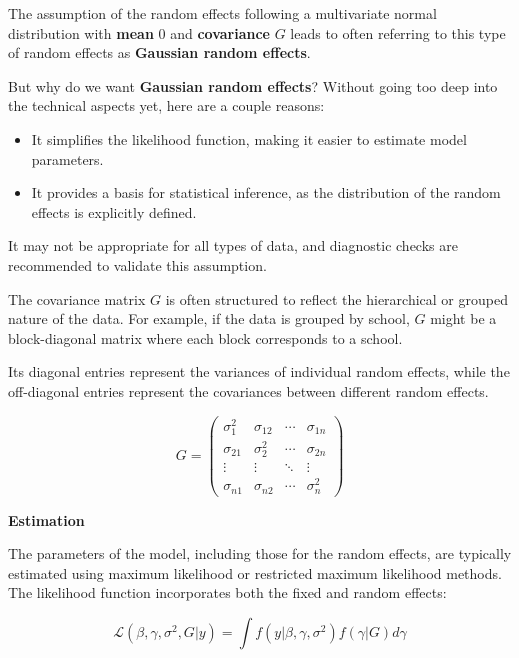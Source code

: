 \documentclass[12pt, twoside,hidelinks]{article}
\theoremstyle{definition}
\numberwithin{equation}{section}
\begin{document}
The assumption of the random effects following a multivariate normal distribution with \textbf{mean} $0$ and \textbf{covariance} $G$ leads to often referring to this type of random effects as \textbf{Gaussian random effects}.
\newline

But why do we want \textbf{Gaussian random effects}? Without going too deep into the technical aspects yet, here are a couple reasons:

\begin{itemize}
    \item It simplifies the likelihood function, making it easier to estimate model parameters.
    \item It provides a basis for statistical inference, as the distribution of the random effects is explicitly defined.
\end{itemize}

It may not be appropriate for all types of data, and diagnostic checks are recommended to validate this assumption.
\newline


The covariance matrix \( G \) is often structured to reflect the hierarchical or grouped nature of the data. For example, if the data is grouped by school, \( G \) might be a block-diagonal matrix where each block corresponds to a school.
\newline

Its diagonal entries represent the variances of individual random effects, while the off-diagonal entries represent the covariances between different random effects.

\[
G = \begin{pmatrix}
\sigma^2_1 & \sigma_{12} & \cdots & \sigma_{1n} \\
\sigma_{21} & \sigma^2_2 & \cdots & \sigma_{2n} \\
\vdots & \vdots & \ddots & \vdots \\
\sigma_{n1} & \sigma_{n2} & \cdots & \sigma^2_n
\end{pmatrix}
\]


\textbf{Estimation}
\newline

The parameters of the model, including those for the random effects, are typically estimated using maximum likelihood or restricted maximum likelihood methods. The likelihood function incorporates both the fixed and random effects:

\[
\mathcal{L}(\beta, \gamma, \sigma^2, G | y) = \int f(y | \beta, \gamma, \sigma^2) f(\gamma | G) d\gamma
\]
\end{document}
